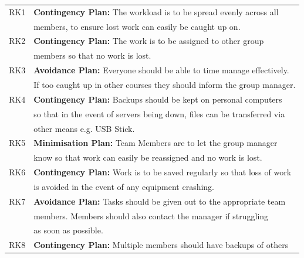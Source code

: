 \documentclass[11pt, a4paper]{report}
\begin{document}
\begin{tabular}{l|l}
	RK1 & {\bfseries Contingency Plan:} The workload is to be spread evenly across all   \\
	
	& members, to ensure lost work can easily be caught up on.\\
	
	RK2 & {\bfseries Contingency Plan:} The work is to be assigned to other group  \\
	
	& members so that no work is lost.\\
	
	RK3 & {\bfseries Avoidance Plan:} Everyone should be able to time manage effectively. \\
	
	& If too caught up in other courses they should inform the group manager.\\
	
	RK4 & {\bfseries Contingency Plan:} Backups should be kept on personal computers  \\ 
	
	& so that in the event of servers being down, files can be transferred via  \\
	
	& other means e.g. USB Stick.\\
	
	RK5 & {\bfseries Minimisation Plan:} Team Members are to let the group manager  \\
	
	& know so that work can easily be reassigned and no work is lost.\\
	
	RK6 & {\bfseries Contingency Plan:} Work is to be saved regularly so that loss of work  \\
	
	& is avoided in the event of any equipment crashing.\\
	
	RK7 & {\bfseries Avoidance Plan:} Tasks should be given out to the appropriate team  \\
	
	& members. Members should also contact the manager if struggling \\
	
	& as soon as possible.\\
	
	RK8 & {\bfseries Contingency Plan:} Multiple members should have backups of others  \\
	

\end{tabular}
\end{document}
